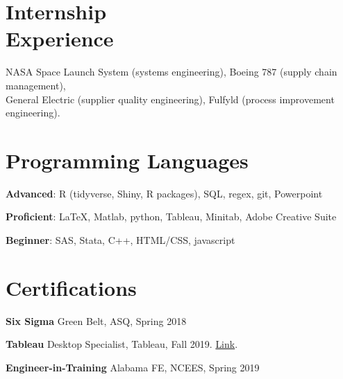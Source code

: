 \documentclass[margin,line]{res}
\begin{document}
\begin{resume}
\vspace{-.35cm}
\section{\sc Internship \\ Experience}
NASA Space Launch System (systems engineering), Boeing 787 (supply chain management), \\ General Electric (supplier quality engineering), Fulfyld (process improvement engineering). 



\vspace{.25cm}
\section{\sc Programming Languages} 
{\bf Advanced}:  R (tidyverse, Shiny, R packages), SQL, regex, git, Powerpoint
\vspace*{-3mm}

{\bf Proficient}:  \LaTeX, Matlab, python, Tableau, Minitab, Adobe Creative Suite
\vspace*{-3mm}

{\bf Beginner}:  SAS, Stata, C++, HTML/CSS, javascript
\vspace*{-3mm}


\vspace{.15cm}

\section{\sc Certifications}
{\bf Six Sigma} Green Belt, ASQ, Spring 2018
\vspace*{-3mm}

{\bf Tableau} Desktop Specialist, Tableau, Fall 2019. \href{https://www.credly.com/badges/e9a605a8-1977-4a1c-ab24-149a37c7fb36/linked_in_profile}{Link}.
\vspace*{-3mm}

{\bf Engineer-in-Training} Alabama FE, NCEES, Spring 2019
\vspace*{-3mm}


\end{resume}
\end{document}
